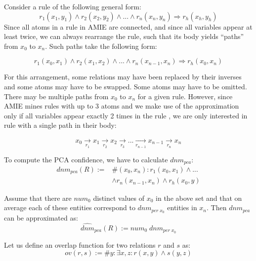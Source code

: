 {{Consider a rule of the following general form:
$$
  r_1(x_1,y_1) \wedge r_2(x_2,y_2) \wedge ... \wedge r_n(x_n,y_n) \Rightarrow r_h(x_h,y_h)
$$
Since all atoms in a rule in AMIE are connected, and since all variables appear at least twice, we can always rearrange the rule, such that its body yields  ``paths'' from $x_0$ to $x_n$. Such paths take the following form:

$$
  r_1(x_0,x_1) \wedge r_2(x_1,x_2) \wedge ... \wedge r_n(x_{n-1},x_n) \Rightarrow r_h(x_0,x_n)
$$


For this arrangement, some relations may have been replaced by their inverses and some atoms may have to be swapped. Some atoms may have to be omitted.
There may be multiple paths from $x_0$ to $x_n$ for a given rule.
However, since AMIE mines rules with up to 3 atoms and we make use of the approximation only if all variables appear exactly 2 times in the rule
,
we are only interested in rule with a single path in their body: 

\[
 x_0 \xrightarrow[r_1]{}x_1 \xrightarrow[r_2]{}     x_2 \xrightarrow[r_3]{}...  \xrightarrow[r_{n-1}]{}  x_{n-1}  \xrightarrow[r_n]{}   x_n
\]

To compute the PCA confidence, we have to calculate $dnm_{pca}$:
$$
\begin{array}{rl}
dnm_{pca}(R):=&\#(x_0,x_n): r_1(x_0,x_1) \wedge ...\\& \wedge r_n(x_{n-1},x_n) \wedge r_h(x_0,y)
\end{array}
$$

Assume that there are $num_0$ distinct values of $x_0$ in the above set and that on average each of these entities correspond to $dnm_{per\; x_0}$ entities in $x_n$.
Then $dnm_{pca}$ can be approximated as:
\[
  \widehat{dnm}_{pca}(R) := num_0 \; dnm_{per\; x_0}
\]

Let us define an overlap function for two relations $r$ and $s$ as:
$$ov(r,s) := \# y: \exists x,z: r(x,y) \wedge s(y,z)$$

}}
